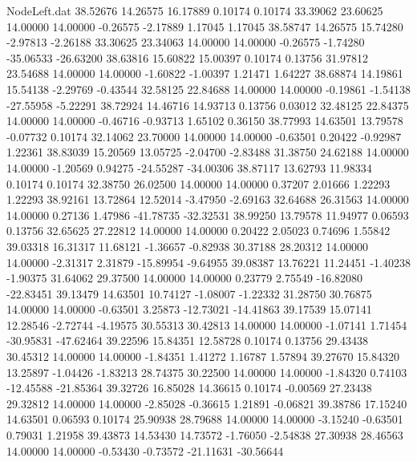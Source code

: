 \begin{filecontents}{NodeLeft.dat}
  38.52676   14.26575   16.17889     0.10174    0.10174   33.39062   23.60625   14.00000   14.00000   -0.26575   -2.17889    1.17045    1.17045
  38.58747   14.26575   15.74280    -2.97813   -2.26188   33.30625   23.34063   14.00000   14.00000   -0.26575   -1.74280  -35.06533  -26.63200
  38.63816   15.60822   15.00397     0.10174    0.13756   31.97812   23.54688   14.00000   14.00000   -1.60822   -1.00397    1.21471    1.64227
  38.68874   14.19861   15.54138    -2.29769   -0.43544   32.58125   22.84688   14.00000   14.00000   -0.19861   -1.54138  -27.55958   -5.22291
  38.72924   14.46716   14.93713     0.13756    0.03012   32.48125   22.84375   14.00000   14.00000   -0.46716   -0.93713    1.65102    0.36150
  38.77993   14.63501   13.79578    -0.07732    0.10174   32.14062   23.70000   14.00000   14.00000   -0.63501    0.20422   -0.92987    1.22361
  38.83039   15.20569   13.05725    -2.04700   -2.83488   31.38750   24.62188   14.00000   14.00000   -1.20569    0.94275  -24.55287  -34.00306
  38.87117   13.62793   11.98334     0.10174    0.10174   32.38750   26.02500   14.00000   14.00000    0.37207    2.01666    1.22293    1.22293
  38.92161   13.72864   12.52014    -3.47950   -2.69163   32.64688   26.31563   14.00000   14.00000    0.27136    1.47986  -41.78735  -32.32531
  38.99250   13.79578   11.94977     0.06593    0.13756   32.65625   27.22812   14.00000   14.00000    0.20422    2.05023    0.74696    1.55842
  39.03318   16.31317   11.68121    -1.36657   -0.82938   30.37188   28.20312   14.00000   14.00000   -2.31317    2.31879  -15.89954   -9.64955
  39.08387   13.76221   11.24451    -1.40238   -1.90375   31.64062   29.37500   14.00000   14.00000    0.23779    2.75549  -16.82080  -22.83451
  39.13479   14.63501   10.74127    -1.08007   -1.22332   31.28750   30.76875   14.00000   14.00000   -0.63501    3.25873  -12.73021  -14.41863
  39.17539   15.07141   12.28546    -2.72744   -4.19575   30.55313   30.42813   14.00000   14.00000   -1.07141    1.71454  -30.95831  -47.62464
  39.22596   15.84351   12.58728     0.10174    0.13756   29.43438   30.45312   14.00000   14.00000   -1.84351    1.41272    1.16787    1.57894
  39.27670   15.84320   13.25897    -1.04426   -1.83213   28.74375   30.22500   14.00000   14.00000   -1.84320    0.74103  -12.45588  -21.85364
  39.32726   16.85028   14.36615     0.10174   -0.00569   27.23438   29.32812   14.00000   14.00000   -2.85028   -0.36615    1.21891   -0.06821
  39.38786   17.15240   14.63501     0.06593    0.10174   25.90938   28.79688   14.00000   14.00000   -3.15240   -0.63501    0.79031    1.21958
  39.43873   14.53430   14.73572    -1.76050   -2.54838   27.30938   28.46563   14.00000   14.00000   -0.53430   -0.73572  -21.11631  -30.56644

\end{filecontents}
